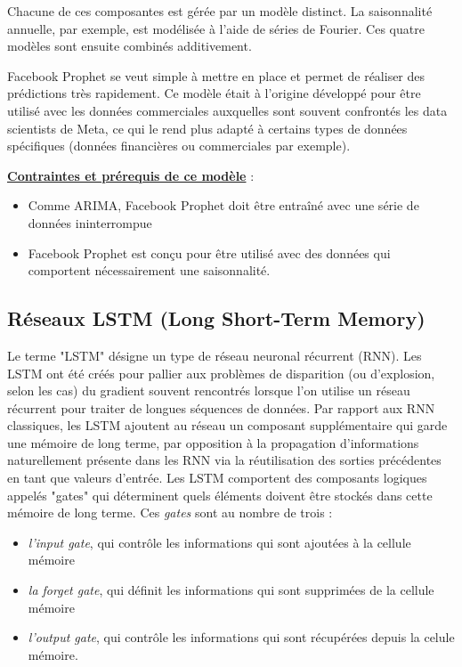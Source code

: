 \documentclass[french]{article}
\begin{document}
    Chacune de ces composantes est gérée par un modèle distinct. La saisonnalité annuelle, par exemple, est modélisée à l'aide de séries de Fourier. Ces quatre modèles sont ensuite combinés additivement.
    
    Facebook Prophet se veut simple à mettre en place et permet de réaliser des prédictions très rapidement. Ce modèle était à l'origine développé pour être utilisé avec les données commerciales auxquelles sont souvent confrontés les data scientists de Meta, ce qui le rend plus adapté à certains types de données spécifiques (données financières ou commerciales par exemple). 

    \underline{\textbf{Contraintes et prérequis de ce modèle}} : 
    \begin{itemize}
        \item Comme ARIMA, Facebook Prophet doit être entraîné avec une série de données ininterrompue
        \item Facebook Prophet est conçu pour être utilisé avec des données qui comportent nécessairement une saisonnalité.
    \end{itemize}
    
    \subsection{Réseaux LSTM (Long Short-Term Memory)}

    Le terme "LSTM" désigne un type de réseau neuronal récurrent (RNN). Les LSTM ont été créés pour pallier aux problèmes de disparition (ou d'explosion, selon les cas) du gradient souvent rencontrés lorsque l'on utilise un réseau récurrent pour traiter de longues séquences de données.
    Par rapport aux RNN classiques, les LSTM ajoutent au réseau un composant supplémentaire qui garde une mémoire de long terme, par opposition à la propagation d'informations naturellement présente dans les RNN via la réutilisation des sorties précédentes en tant que valeurs d'entrée. Les LSTM comportent des composants logiques appelés "gates" qui déterminent quels éléments doivent être stockés dans cette mémoire de long terme. Ces \textit{gates} sont au nombre de trois :
    \begin{itemize}
        \item \textit{l'input gate}, qui contrôle les informations qui sont ajoutées à la cellule mémoire
        \item \textit{la forget gate}, qui définit les informations qui sont supprimées de la cellule mémoire
        \item \textit{l'output gate}, qui contrôle les informations qui sont récupérées depuis la celule mémoire.
    \end{itemize}
\end{document}
